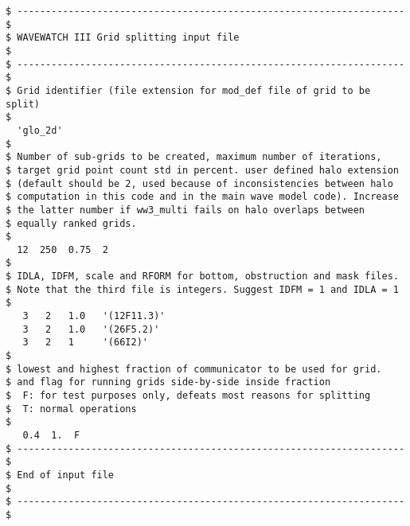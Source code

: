 \begin{footnotesize}
\begin{verbatim}
$ -------------------------------------------------------------------- $
$ WAVEWATCH III Grid splitting input file                              $
$ -------------------------------------------------------------------- $
$ Grid identifier (file extension for mod_def file of grid to be split)
$
  'glo_2d'
$
$ Number of sub-grids to be created, maximum number of iterations,
$ target grid point count std in percent. user defined halo extension
$ (default should be 2, used because of inconsistencies between halo
$ computation in this code and in the main wave model code). Increase
$ the latter number if ww3_multi fails on halo overlaps between 
$ equally ranked grids.
$
  12  250  0.75  2
$
$ IDLA, IDFM, scale and RFORM for bottom, obstruction and mask files.
$ Note that the third file is integers. Suggest IDFM = 1 and IDLA = 1
$
   3   2   1.0   '(12F11.3)'
   3   2   1.0   '(26F5.2)'
   3   2   1     '(66I2)'
$
$ lowest and highest fraction of communicator to be used for grid.
$ and flag for running grids side-by-side inside fraction
$  F: for test purposes only, defeats most reasons for splitting
$  T: normal operations
$
   0.4  1.  F
$ -------------------------------------------------------------------- $
$ End of input file                                                    $
$ -------------------------------------------------------------------- $
\end{verbatim}
\end{footnotesize}
